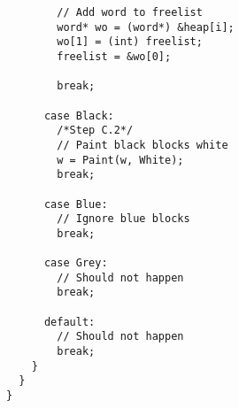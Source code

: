 \begin{lstlisting}
		// Add word to freelist
		word* wo = (word*) &heap[i];
        wo[1] = (int) freelist;
        freelist = &wo[0];
  		
  		break;
  		
  	  case Black:
	    /*Step C.2*/
  	    // Paint black blocks white
  	    w = Paint(w, White);
		break;
  		
  	  case Blue:
  	    // Ignore blue blocks
		break;
  		
  	  case Grey:
  	    // Should not happen
  		break;
  		
  	  default:
  	    // Should not happen
  		break;
  	}
  }
}
\end{lstlisting}